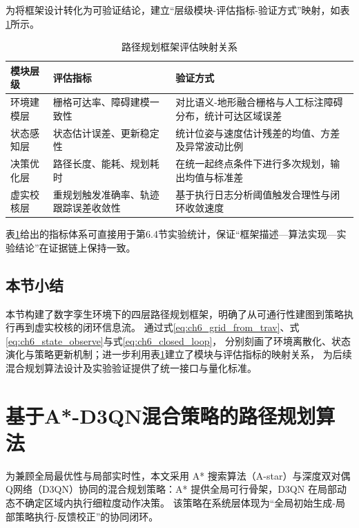 \documentclass[UTF8,zihao=-4,a4paper,oneside,openany]{ctexrep}
\numberwithin{equation}{chapter}
\renewcommand{\small}{\normalsize}
\renewcommand{\small}{\normalsize}
\theoremstyle{plain}
\theoremstyle{definition}
\begin{document}
为将框架设计转化为可验证结论，建立“层级模块-评估指标-验证方式”映射，如表\ref{tab:ch6_framework_eval}所示。

\begin{table}[H]
	\centering
	\small
	\caption{路径规划框架评估映射关系}
	\label{tab:ch6_framework_eval}
	\begin{tabular}{p{}p{}p{}}
		\toprule
		模块层级 & 评估指标 & 验证方式 \\
		\midrule
		环境建模层 & 栅格可达率、障碍建模一致性 & 对比语义-地形融合栅格与人工标注障碍分布，统计可达区域误差 \\
		状态感知层 & 状态估计误差、更新稳定性 & 统计位姿与速度估计残差的均值、方差及异常波动比例 \\
		决策优化层 & 路径长度、能耗、规划耗时 & 在统一起终点条件下进行多次规划，输出均值与标准差 \\
		虚实校核层 & 重规划触发准确率、轨迹跟踪误差收敛性 & 基于执行日志分析阈值触发合理性与闭环收敛速度 \\
		\bottomrule
	\end{tabular}
\end{table}

表\ref{tab:ch6_framework_eval}给出的指标体系可直接用于第6.4节实验统计，保证“框架描述—算法实现—实验结论”在证据链上保持一致。

\subsection{本节小结}

本节构建了数字孪生环境下的四层路径规划框架，明确了从可通行性建图到策略执行再到虚实校核的闭环信息流。
通过式\eqref{eq:ch6_grid_from_trav}、式\eqref{eq:ch6_state_observe}与式\eqref{eq:ch6_closed_loop}，
分别刻画了环境离散化、状态演化与策略更新机制；进一步利用表\ref{tab:ch6_framework_eval}建立了模块与评估指标的映射关系，
为后续混合规划算法设计及实验验证提供了统一接口与量化标准。

\section{基于A*-D3QN混合策略的路径规划算法}
\label{sec:ch6_ad3qn}

为兼顾全局最优性与局部实时性，本文采用 A* 搜索算法（A-star）与深度双对偶Q网络（D3QN）协同的混合规划策略：A* 提供全局可行骨架，D3QN 在局部动态不确定区域内执行细粒度动作决策。
该策略在系统层体现为“全局初始生成-局部策略执行-反馈校正”的协同闭环。
\end{document}
